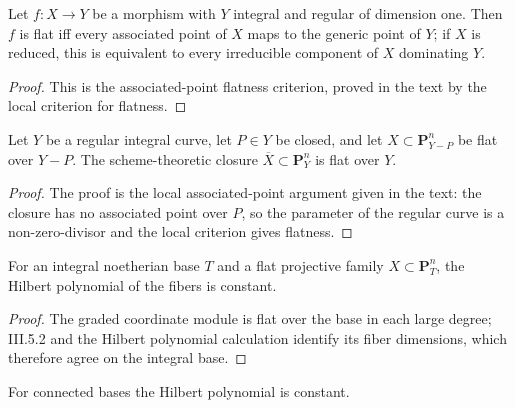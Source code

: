 \begin{proposition}\label{ha-ch3-prop-flat-specialization}
Let $f:X\to Y$ be a morphism with $Y$ integral and regular of dimension one.
Then $f$ is flat iff every associated point of $X$ maps to the generic point
of $Y$; if $X$ is reduced, this is equivalent to every irreducible component
of $X$ dominating $Y$.

\end{proposition}
\begin{proof}

This is the associated-point flatness criterion, proved in the text by the
local criterion for flatness.

\end{proof}
\begin{proposition}\label{ha-ch3-prop-flat-limitations}
Let $Y$ be a regular integral curve, let $P\in Y$ be closed, and let
$X\subset\mathbf P^n_{Y-P}$ be flat over $Y-P$.  The scheme-theoretic closure
$\overline X\subset\mathbf P^n_Y$ is flat over $Y$.

\end{proposition}
\begin{proof}

The proof is the local associated-point argument given in the text: the
closure has no associated point over $P$, so the parameter of the regular
curve is a non-zero-divisor and the local criterion gives flatness.

\end{proof}
\begin{theorem}\label{ha-ch3-thm-flat-family}
For an integral noetherian base $T$ and a flat projective family
$X\subset\mathbf P_T^n$, the Hilbert polynomial of the fibers is constant.

\end{theorem}
\begin{proof}
The graded coordinate module is flat over the base in each large
degree; III.5.2 and the Hilbert polynomial calculation identify its fiber
dimensions, which therefore agree on the integral base.
\end{proof}
\begin{corollary}\label{ha-ch3-cor-flat-family}
For connected bases the Hilbert polynomial is constant.

\end{corollary}
